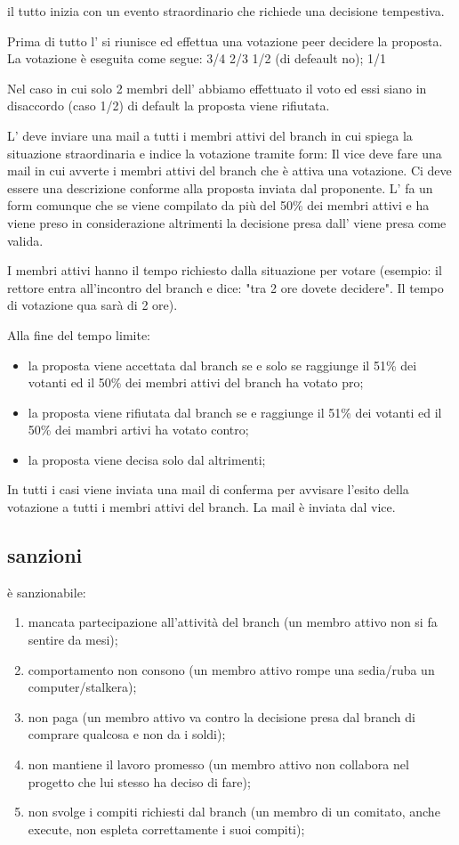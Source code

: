 il tutto inizia con un evento straordinario che richiede una decisione tempestiva.

Prima di tutto l'\EC{} si riunisce ed effettua una votazione peer decidere la proposta.
La votazione è eseguita come segue:
3/4
2/3
1/2 (di defeault no);
1/1

Nel caso in cui solo 2 membri dell'\EC{} abbiamo effettuato il voto ed essi siano in disaccordo (caso 1/2) di default la proposta viene rifiutata.

L'\EC{} deve inviare una mail a tutti i membri attivi del branch in cui spiega la situazione straordinaria e indice la votazione tramite form: 
Il vice deve fare una mail in cui avverte i membri attivi del branch che è attiva una votazione. Ci deve essere una descrizione conforme alla proposta inviata dal proponente. 
L'\EC{} fa un form comunque che se viene compilato da più del 50\% dei membri attivi e ha viene preso in considerazione altrimenti la decisione presa dall'\EC{} viene presa come valida.

I membri attivi hanno il tempo richiesto dalla situazione per votare (esempio: il rettore entra all'incontro del branch e dice: "tra 2 ore dovete decidere". Il tempo di votazione qua sarà di 2 ore).

Alla fine del tempo limite:

\begin{itemize}
	\item la proposta viene accettata dal branch se e solo se raggiunge il 51\% dei votanti ed il 50\% dei membri attivi del branch ha votato pro;
	\item la proposta viene rifiutata dal branch se e raggiunge il 51\% dei votanti ed il 50\% dei mambri artivi ha votato contro;
	\item la proposta viene decisa solo dal \EC{} altrimenti;
\end{itemize}

In tutti i casi viene inviata una mail di conferma per  avvisare l'esito della votazione a tutti i membri attivi del branch. La mail è inviata dal vice.

\subsection{sanzioni}

è sanzionabile:

\begin{enumerate}
	\item mancata partecipazione all'attività del branch (un membro attivo non si fa sentire da mesi);
	\item comportamento non consono (un membro attivo rompe una sedia/ruba un computer/stalkera);
	\item non paga (un membro attivo va contro la decisione presa dal branch di comprare qualcosa e non da i soldi);
	\item non mantiene il lavoro promesso (un membro attivo non collabora nel progetto che lui stesso ha deciso di fare);
	\item non svolge i compiti richiesti dal branch (un membro di un comitato, anche execute, non espleta correttamente i suoi compiti);
\end{enumerate}

